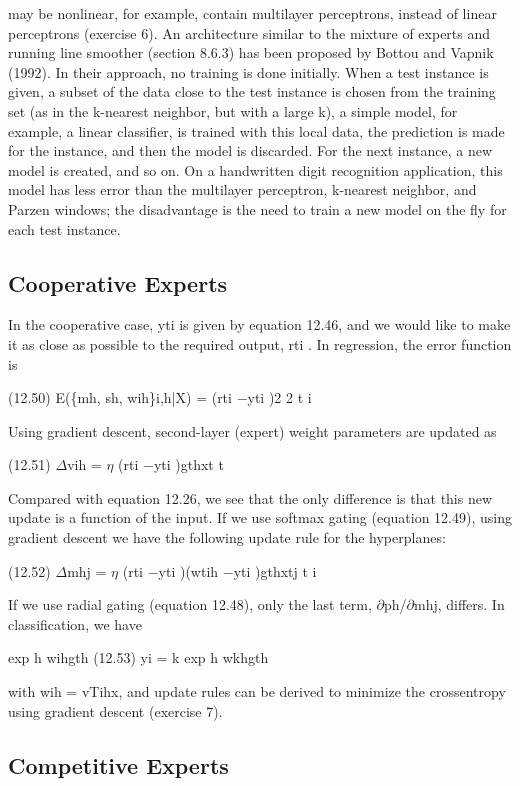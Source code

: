 may be nonlinear, for example, contain multilayer perceptrons, instead of linear perceptrons (exercise 6). An architecture similar to the mixture of experts and running line smoother (section 8.6.3) has been proposed by Bottou and Vapnik (1992). In their approach, no training is done initially. When a test instance is given, a subset of the data close to the test instance is chosen from the training set (as in the k-nearest neighbor, but with a large k), a simple model, for example, a linear classifier, is trained with this local data, the prediction is made for the instance, and then the model is discarded. For the next instance, a new model is created, and so on. On a handwritten digit recognition application, this model has less error than the multilayer perceptron, k-nearest neighbor, and Parzen windows; the disadvantage is the need to train a new model on the fly for each test instance.

\subsection{Cooperative Experts}

In the cooperative case, yti is given by equation 12.46, and we would like to make it as close as possible to the required output, rti . In regression, the error function is

(12.50) E(\{mh, sh, wih\}i,h|X) = (rti $-$yti )2 2 t i

Using gradient descent, second-layer (expert) weight parameters are updated as

(12.51) $\Delta$vih = $\eta$ (rti $-$yti )gthxt t

Compared with equation 12.26, we see that the only difference is that this new update is a function of the input. If we use softmax gating (equation 12.49), using gradient descent we have the following update rule for the hyperplanes:

(12.52) $\Delta$mhj = $\eta$ (rti $-$yti )(wtih $-$yti )gthxtj t i

If we use radial gating (equation 12.48), only the last term, $\partial$ph/$\partial$mhj, differs. In classification, we have

exp h wihgth (12.53) yi = k exp h wkhgth

with wih = vTihx, and update rules can be derived to minimize the crossentropy using gradient descent (exercise 7).

\subsection{Competitive Experts}

